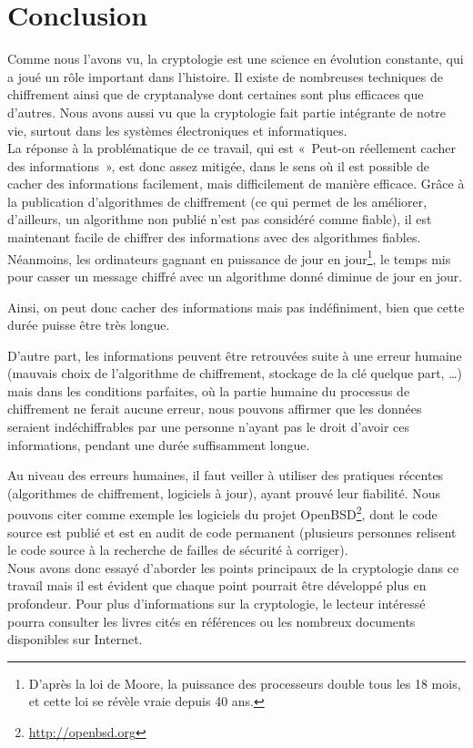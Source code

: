 \chapter{Conclusion}
\thispagestyle{empty}

Comme nous l'avons vu, la cryptologie est une science en
évolution constante, qui a joué un rôle important dans l'histoire.
Il existe de nombreuses techniques de chiffrement ainsi que de
cryptanalyse dont certaines sont plus efficaces que d'autres. Nous avons aussi
vu que la cryptologie fait partie intégrante de notre vie, surtout
dans les systèmes électroniques et informatiques.
\\

La réponse à la problématique de ce travail, qui est «~Peut-on
réellement cacher des informations~», est donc assez mitigée, dans
le sens où il est possible de cacher des informations
facilement, mais difficilement de manière efficace.
Grâce à la publication d'algorithmes de chiffrement (ce qui 
permet de les améliorer, d'ailleurs, un algorithme non
publié n'est pas considéré comme fiable), il est maintenant facile
de chiffrer des informations avec des algorithmes fiables. Néanmoins,
les ordinateurs gagnant en puissance de jour en jour\footnote{D'après la
loi de Moore, la puissance des processeurs double tous les 18
mois, et cette loi se révèle vraie depuis 40 ans.}, le temps mis
pour casser un message chiffré avec un algorithme donné diminue de
jour en jour. %

Ainsi, on peut donc cacher des informations mais pas
indéfiniment, bien que cette durée puisse être très longue.

D'autre part, les informations peuvent être retrouvées suite à une
erreur humaine (mauvais choix de l'algorithme de chiffrement,
stockage de la clé quelque part, …) 
mais dans les conditions parfaites, où la partie
humaine du processus de chiffrement ne ferait aucune erreur, nous
pouvons affirmer que les données seraient indéchiffrables par une
personne n'ayant pas le droit d'avoir ces informations, pendant
une durée suffisamment longue.

Au niveau des erreurs humaines, il faut veiller à utiliser des
pratiques récentes (algorithmes de chiffrement, logiciels à
jour), ayant
prouvé leur fiabilité. Nous pouvons citer comme exemple les logiciels du
projet OpenBSD\footnote{\url{http://openbsd.org}}, dont le code
source est publié et est en audit de code permanent (plusieurs
personnes relisent le code source à la recherche de failles de
sécurité à corriger).
\\

Nous avons donc essayé d'aborder les points principaux de la
cryptologie dans ce travail mais il est évident que chaque point
pourrait être développé plus en profondeur. Pour plus
d'informations sur la cryptologie, le lecteur intéressé  pourra consulter les livres
cités en références ou les nombreux documents
disponibles sur Internet.

